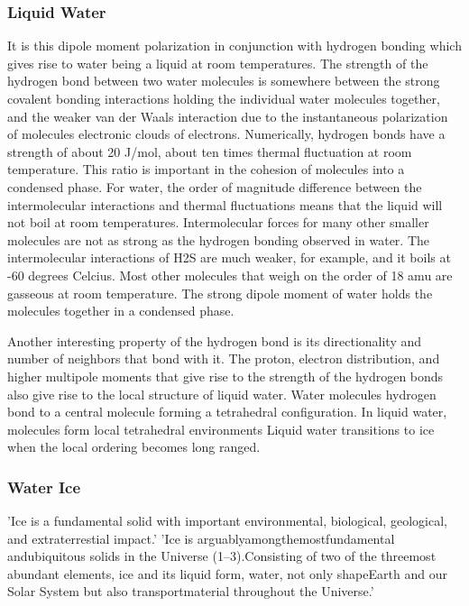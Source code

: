 \subsubsection{Liquid Water}
It is this dipole moment polarization in conjunction with hydrogen
bonding which gives rise to water being a liquid at room
temperatures. The strength of the hydrogen bond between two water
molecules is somewhere between the strong covalent bonding
interactions holding the individual water molecules together, and the
weaker van der Waals interaction due to the instantaneous polarization
of molecules electronic clouds of electrons. Numerically, hydrogen
bonds have a strength of about 20 J/mol, about ten times thermal
fluctuation at room temperature. This ratio is important in the
cohesion of molecules into a condensed phase. For water, the order of
magnitude difference between the intermolecular interactions and
thermal fluctuations means that the liquid will not boil at room
temperatures. Intermolecular forces for many other smaller molecules
are not as strong as the hydrogen bonding observed in water. The
intermolecular interactions of H2S are much weaker, for example, and
it boils at -60 degrees Celcius. Most other molecules that weigh on
the order of 18 amu are gasseous at room temperature. The strong
dipole moment of water holds the molecules together in a condensed
phase.

Another interesting property of the hydrogen bond is its
directionality and number of neighbors that bond with it. The proton,
electron distribution, and higher multipole moments that give rise to
the strength of the hydrogen bonds also give rise to the local
structure of liquid water. Water molecules hydrogen bond to a central
molecule forming a tetrahedral configuration. In liquid water,
molecules form local tetrahedral environments Liquid water transitions
to ice when the local ordering becomes long ranged.


\subsubsection{Water Ice}
%
%
'Ice is a fundamental solid with important environmental, biological,
geological, and extraterrestial impact.'\cite{Shultz17} 'Ice is
arguablyamongthemostfundamental andubiquitous solids in the Universe
(1–3).Consisting of two of the threemost abundant elements, ice and
its liquid form, water, not only shapeEarth and our Solar System but
also transportmaterial throughout the Universe.' 

